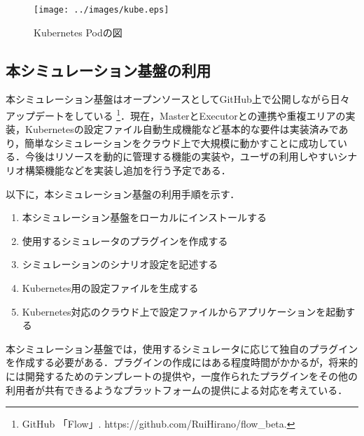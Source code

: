 \documentclass[originalpaper]{jsaiart}     %
\begin{document}
\begin{figure}[t]
    \begin{center}
        \texttt{[image: ../images/kube.eps]}
    \end{center}
    \caption{Kubernetes Podの図}
    \label{dummy}
\end{figure}



\subsection{本シミュレーション基盤の利用}%

本シミュレーション基盤はオープンソースとしてGitHub上で公開しながら日々アップデートをしている \footnote{GitHub 「Flow」. https://github.com/RuiHirano/flow\_beta.}．現在，MasterとExecutorとの連携や重複エリアの実装，Kubernetesの設定ファイル自動生成機能など基本的な要件は実装済みであり，簡単なシミュレーションをクラウド上で大規模に動かすことに成功している．今後はリソースを動的に管理する機能の実装や，ユーザの利用しやすいシナリオ構築機能などを実装し追加を行う予定である．

以下に，本シミュレーション基盤の利用手順を示す．
\begin{enumerate}
    \item 本シミュレーション基盤をローカルにインストールする
    \item 使用するシミュレータのプラグインを作成する
    \item シミュレーションのシナリオ設定を記述する
    \item Kubernetes用の設定ファイルを生成する
    \item Kubernetes対応のクラウド上で設定ファイルからアプリケーションを起動する
 \end{enumerate}

 本シミュレーション基盤では，使用するシミュレータに応じて独自のプラグインを作成する必要がある．プラグインの作成にはある程度時間がかかるが，将来的には開発するためのテンプレートの提供や，一度作られたプラグインをその他の利用者が共有できるようなプラットフォームの提供による対応を考えている．
\end{document}
